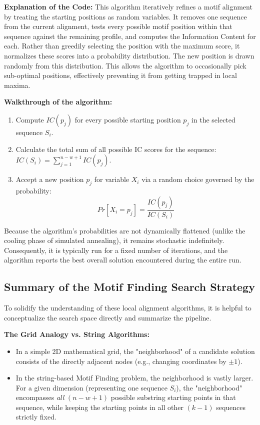 \documentclass[11pt, a4paper]{article}
\begin{document}
\textbf{Explanation of the Code:}
This algorithm iteratively refines a motif alignment by treating the starting positions as random variables. It removes one sequence from the current alignment, tests every possible motif position within that sequence against the remaining profile, and computes the Information Content for each. Rather than greedily selecting the position with the maximum score, it normalizes these scores into a probability distribution. The new position is drawn randomly from this distribution. This allows the algorithm to occasionally pick sub-optimal positions, effectively preventing it from getting trapped in local maxima.

\textbf{Walkthrough of the algorithm:}
\begin{enumerate}
    \item Compute $IC(p_j)$ for every possible starting position $p_j$ in the selected sequence $S_i$.
    \item Calculate the total sum of all possible IC scores for the sequence: $IC(S_i) = \sum_{j=1}^{n-w+1} IC(p_j)$.
    \item Accept a new position $p_j$ for variable $X_i$ via a random choice governed by the probability:
    \[ Pr[X_i = p_j] = \frac{IC(p_j)}{IC(S_i)} \]
\end{enumerate}
Because the algorithm's probabilities are not dynamically flattened (unlike the cooling phase of simulated annealing), it remains stochastic indefinitely. Consequently, it is typically run for a fixed number of iterations, and the algorithm reports the best overall solution encountered during the entire run.


\subsection{Summary of the Motif Finding Search Strategy}
To solidify the understanding of these local alignment algorithms, it is helpful to conceptualize the search space directly and summarize the pipeline. 

\textbf{The Grid Analogy vs. String Algorithms:}
\begin{itemize}
    \item In a simple 2D mathematical grid, the "neighborhood" of a candidate solution consists of the directly adjacent nodes (e.g., changing coordinates by $\pm 1$).
    \item In the string-based Motif Finding problem, the neighborhood is vastly larger. For a given dimension (representing one sequence $S_i$), the "neighborhood" encompasses \textit{all} $(n - w + 1)$ possible substring starting points in that sequence, while keeping the starting points in all other $(k - 1)$ sequences strictly fixed. 
\end{itemize}
\end{document}
